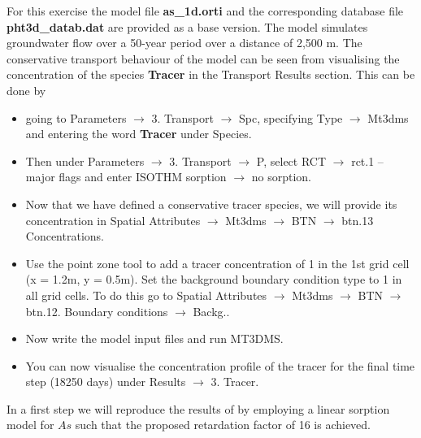 For this exercise the model file {\color{blue}\textbf{as\_1d.orti}} and the corresponding database file {\color{blue}\textbf{pht3d\_datab.dat}} are provided as a base version. The model simulates groundwater flow over a 50-year period over a distance of 2,500 m. The conservative transport behaviour of the model can be seen from visualising the concentration of the species {\color{blue}\textbf{Tracer}} in the Transport Results section. This can be done by 

\begin{itemize}
\item  going to {\color{blue}Parameters} $\rightarrow$  {\color{blue}3. Transport} $\rightarrow$ {\color{blue}Spc}, specifying {\color{blue}Type} $\rightarrow$ {\color{blue}Mt3dms} and entering the word \textbf{Tracer} under {\color{blue}Species}. 

\item Then under {\color{blue}Parameters} $\rightarrow$ {\color{blue}3. Transport} $\rightarrow$ {\color{blue}P}, select {\color{blue}RCT} $\rightarrow$ {\color{blue}rct.1 – major flags} 
and enter {\color{blue}ISOTHM sorption} $\rightarrow$ no sorption. 

\item Now that we have defined a conservative tracer species, we will provide its concentration in {\color{blue}Spatial Attributes} $\rightarrow$ {\color{blue}Mt3dms} $\rightarrow$ {\color{blue}BTN} $\rightarrow$ {\color{blue}btn.13 Concentrations}. 

\item Use the point zone tool to add a tracer concentration of 1 in the 1st grid cell (x = 1.2m, y = 0.5m). Set the background boundary condition type to 1 in all grid cells. To do this 
go to {\color{blue}Spatial Attributes} $\rightarrow$ {\color{blue}Mt3dms} $\rightarrow$ {\color{blue}BTN} 
$\rightarrow$ {\color{blue}btn.12}. Boundary conditions $\rightarrow$ {\color{blue}Backg.}. 

\item Now write the model input files and run MT3DMS. 

\item You can now visualise the concentration profile of the tracer 
for the final time step (18250 days) under {\color{blue}Results} $\rightarrow$ {\color{blue}3. Tracer}.
\end{itemize}

In a first step we will reproduce the results of \cite{vangeen2013} by 
employing a linear sorption model for $As$ such that the proposed retardation factor of 16 is achieved. 

